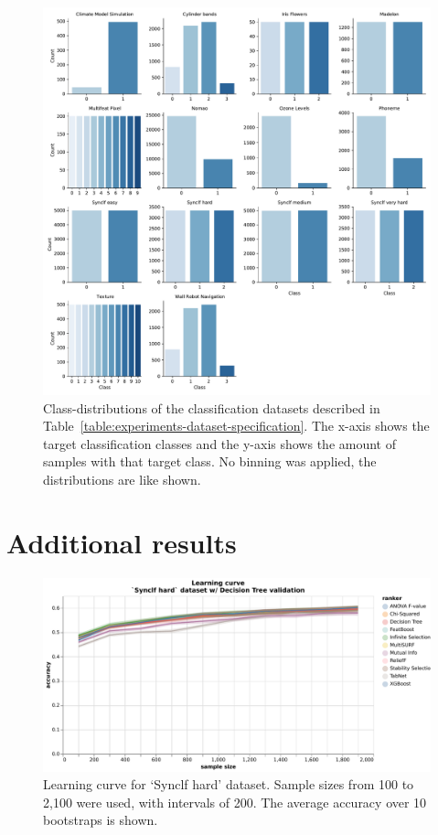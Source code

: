 \documentclass[../main.tex]{subfiles}
\begin{document}
\begin{figure}[ht]
    \centering
    \includegraphics[width=\linewidth]{report/images/experiments_datasets_class_distributions.pdf}
    \caption{Class-distributions of the classification datasets described in Table~\ref{table:experiments-dataset-specification}. The x-axis shows the target classification classes and the y-axis shows the amount of samples with that target class. No binning was applied, the distributions are like shown.}
    \label{fig:experiments-datasets-class-distributions}
\end{figure}



\clearpage
\section{Additional results}\label{section:appendix-additional-results}

\begin{figure}[ht]
    \centering
    \includegraphics[width=\linewidth]{report/images/results-learning-curve.pdf}
    \caption{Learning curve for `Synclf hard' dataset. Sample sizes from 100 to 2,100 were used, with intervals of 200. The average accuracy over 10 bootstraps is shown.}
    \label{fig:results-learning-curve}
\end{figure}
\end{document}
